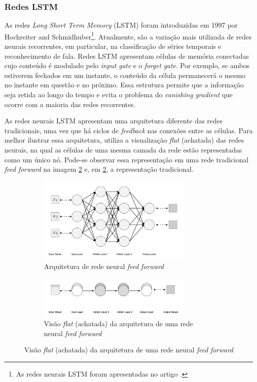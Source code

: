 \subsubsection{Redes LSTM}

As redes \textit{Long Short Term Memory} (LSTM) foram introduzidas em 1997 por Hochreiter 
and Schmidhuber\footnote{As redes neurais LSTM foram apresentadas no artigo \cite{lstm-origem}.}.
Atualmente, são a variação mais utilizada de redes
neurais recorrentes, em particular, na classificação de séries temporais e
reconhecimento de fala. Redes LSTM apresentam células de 
memória conectadas cujo conteúdo é modulado pelo \textit{input gate} e o \textit{forget gate}.
Por exemplo, se ambos estiverem fechados em um instante, o conteúdo da célula permanecerá 
o mesmo no instante em questão e no próximo. Essa estrutura permite que a informação
seja retida ao longo do tempo e evita o problema do \textit{vanishing gradient} que 
ocorre com a maioria das redes recorrentes.

As redes neurais LSTM apresentam uma arquitetura diferente 
das redes tradicionais, uma vez que há ciclos de \textit{feedback}
nas conexões entre as células. Para melhor ilustrar essa 
arquitetura, \cite{dl-oreilly} utiliza a visualização \textit{flat} 
 (achatada) das redes neurais, na qual as células de uma mesma 
camada da rede estão representadas como um único nó.
Pode-se observar essa representação em uma rede tradicional 
\textit{feed forward}
na imagem \ref{fig:arq-ff-flat} e, em
\ref{fig:arq-ff-flat}, a representação 
tradicional.

\begin{figure}[H]
  \centering
  \begin{subfigure}{7.5cm}
      \centering
      \includegraphics[width=7.5cm]{../figuras/redes/arq-ff.png}
      \caption{Arquitetura de rede neural \textit{feed forward}}
      \label{fig:arq-ff}
  \end{subfigure}
  \hfill
  \begin{subfigure}{7.5cm}
      \centering
      \includegraphics[width=7.5cm]{../figuras/redes/arq-ff-flat.png}
      \caption{Visão \textit{flat} (achatada) da arquitetura de uma rede neural \textit{feed forward} }
      \label{fig:arq-ff-flat}
  \end{subfigure}
  \label{fig:comparacao-ff-flat-normal}
\end{figure}

